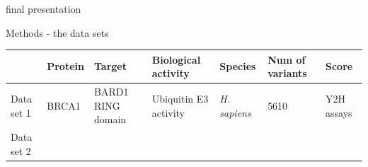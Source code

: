 \documentclass[ignorenonframetext,]{beamer}
\begin{document}
\begin{frame}{final presentation}
\begin{block}{Methods - the data sets}
\begin{longtable}[]{@{}lllllll@{}}
\toprule
\begin{minipage}[b]{0.05\columnwidth}\raggedright
\strut
\end{minipage} & \begin{minipage}[b]{0.04\columnwidth}\raggedright
Protein\strut
\end{minipage} & \begin{minipage}[b]{0.14\columnwidth}\raggedright
Target\strut
\end{minipage} & \begin{minipage}[b]{0.12\columnwidth}\raggedright
Biological activity\strut
\end{minipage} & \begin{minipage}[b]{0.08\columnwidth}\raggedright
Species\strut
\end{minipage} & \begin{minipage}[b]{0.08\columnwidth}\raggedright
Num of variants\strut
\end{minipage} & \begin{minipage}[b]{0.30\columnwidth}\raggedright
Score\strut
\end{minipage}\tabularnewline
\midrule
\endhead
\begin{minipage}[t]{0.05\columnwidth}\raggedright
Data set 1\strut
\end{minipage} & \begin{minipage}[t]{0.04\columnwidth}\raggedright
BRCA1\strut
\end{minipage} & \begin{minipage}[t]{0.14\columnwidth}\raggedright
BARD1 RING domain\strut
\end{minipage} & \begin{minipage}[t]{0.12\columnwidth}\raggedright
Ubiquitin E3 activity\strut
\end{minipage} & \begin{minipage}[t]{0.08\columnwidth}\raggedright
\emph{H. sapiens}\strut
\end{minipage} & \begin{minipage}[t]{0.08\columnwidth}\raggedright
5610\strut
\end{minipage} & \begin{minipage}[t]{0.30\columnwidth}\raggedright
Y2H assays\strut
\end{minipage}\tabularnewline
\begin{minipage}[t]{0.05\columnwidth}\raggedright
Data set 2\strut
\end{minipage} & \begin{minipage}[t]{0.04\columnwidth}\raggedright

\end{minipage}
\end{longtable}
\end{block}
\end{frame}
\end{document}
